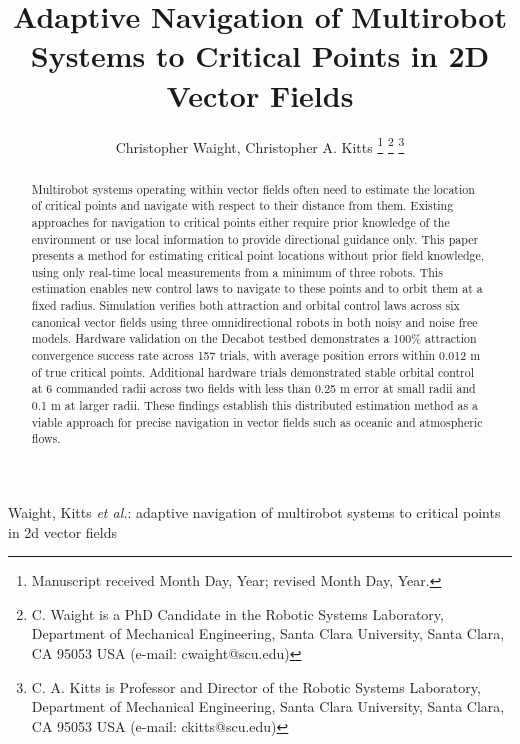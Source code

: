 \documentclass[lettersize,journal]{IEEEtran}
\begin{document}
\title{Adaptive Navigation of Multirobot Systems to Critical Points in 2D Vector Fields}
\author{Christopher Waight, Christopher A. Kitts 
\thanks{Manuscript received Month Day, Year; revised Month Day, Year.}
\thanks{C. Waight is a PhD Candidate in the Robotic Systems Laboratory, Department of Mechanical Engineering, Santa Clara University, Santa Clara, CA 95053 USA (e-mail: cwaight@scu.edu)}
\thanks{C. A. Kitts is Professor and Director of the Robotic Systems Laboratory, Department of Mechanical Engineering, Santa Clara University, Santa Clara, CA 95053 USA (e-mail: ckitts@scu.edu)}
}
%
{Waight, Kitts \MakeLowercase{\textit{et al.}: Adaptive Navigation of Multirobot Systems to Critical Points in 2D Vector Fields}}


\maketitle

\begin{abstract}
    Multirobot systems operating within vector fields often need to estimate the location of critical points and navigate with respect to their distance from them. Existing approaches for navigation to critical points either require prior knowledge of the environment or use local information to provide directional guidance only. This paper presents a method for estimating critical point locations without prior field knowledge, using only real-time local measurements from a minimum of three robots.
    This estimation enables new control laws to navigate to these points and to orbit them at a fixed radius.
    Simulation verifies both attraction and orbital control laws across six canonical vector fields using three omnidirectional robots in both noisy and noise free models. Hardware validation on the Decabot testbed demonstrates a 100\% attraction convergence success rate across 157 trials, with average position errors within 0.012 m of true critical points. Additional hardware trials demonstrated stable orbital control at 6 commanded radii across two fields with less than 0.25 m error at small radii and 0.1 m at larger radii. These findings establish this distributed estimation method as a viable approach for precise navigation in vector fields such as oceanic and atmospheric flows.  

\end{abstract}
\end{document}
